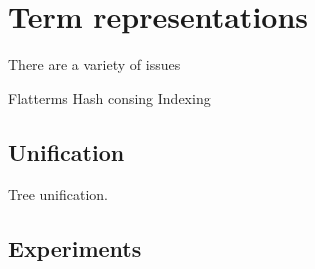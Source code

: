 
\section{Term representations}

There are a variety of issues

Flatterms
Hash consing
Indexing
\cite{Voronkov.2001.IJCAR}
\cite{Hoder.2009.KI}

\subsection{Unification}

Tree unification.

\subsection{Experiments}


